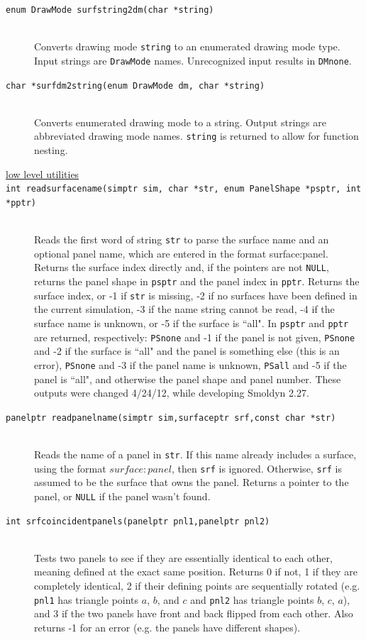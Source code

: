 \documentclass {scrbook}
\newcommand {\ttt} {\texttt}
\begin{document}
\begin{description}
\item[\ttt{enum DrawMode surfstring2dm(char *string)}]
\hfill \\
Converts drawing mode \ttt{string} to an enumerated drawing mode type. Input strings are \ttt{DrawMode} names. Unrecognized input results in \ttt{DMnone}.

\item[\ttt{char *surfdm2string(enum DrawMode dm, char *string)}]
\hfill \\
Converts enumerated drawing mode to a string. Output strings are abbreviated drawing mode names. \ttt{string} is returned to allow for function nesting.

\item[\underline{low level utilities}]

\item[\ttt{int readsurfacename(simptr sim, char *str, enum PanelShape *psptr, int *pptr)}]
\hfill \\
Reads the first word of string \ttt{str} to parse the surface name and an optional panel name, which are entered in the format surface:panel. Returns the surface index directly and, if the pointers are not \ttt{NULL}, returns the panel shape in \ttt{psptr} and the panel index in \ttt{pptr}. Returns the surface index, or -1 if \ttt{str} is missing, -2 if no surfaces have been defined in the current simulation, -3 if the name string cannot be read, -4 if the surface name is unknown, or -5 if the surface is ``all". In \ttt{psptr} and \ttt{pptr} are returned, respectively: \ttt{PSnone} and -1 if the panel is not given, \ttt{PSnone} and -2 if the surface is ``all" and the panel is something else (this is an error), \ttt{PSnone} and -3 if the panel name is unknown, \ttt{PSall} and -5 if the panel is ``all", and otherwise the panel shape and panel number. These outputs were changed 4/24/12, while developing Smoldyn 2.27.

\item[\ttt{panelptr readpanelname(simptr sim,surfaceptr srf,const char *str)}]
\hfill \\
Reads the name of a panel in \ttt{str}. If this name already includes a surface, using the format $surface:panel$, then \ttt{srf} is ignored. Otherwise, \ttt{srf} is assumed to be the surface that owns the panel. Returns a pointer to the panel, or \ttt{NULL} if the panel wasn't found.

\item[\ttt{int srfcoincidentpanels(panelptr pnl1,panelptr pnl2)}]
\hfill \\
Tests two panels to see if they are essentially identical to each other, meaning defined at the exact same position. Returns 0 if not, 1 if they are completely identical, 2 if their defining points are sequentially rotated (e.g. \ttt{pnl1} has triangle points $a$, $b$, and $c$ and \ttt{pnl2} has triangle points $b$, $c$, $a$), and 3 if the two panels have front and back flipped from each other. Also returns -1 for an error (e.g. the panels have different shapes).


\end{description}
\end{document}
